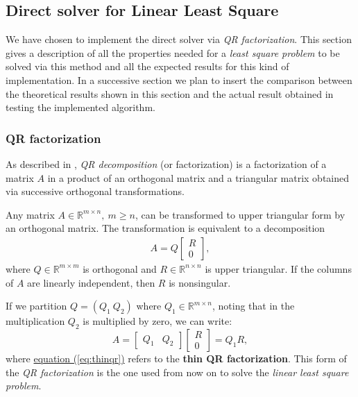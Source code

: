 \subsection{Direct solver for Linear Least Square}
\label{sec:qr}
We have chosen to implement the direct solver via \textit{QR factorization}. This section gives a description of all the properties needed for a \textit{least square problem} to be solved via this method and all the expected results for this kind of implementation. In a successive section we plan to insert the comparison between the theoretical results shown in this section and the actual result obtained in testing the implemented algorithm.
\subsubsection{QR factorization}
\label{subsec:qr}
As described in \parencite[Chap. 5]{elden}, \textit{QR decomposition} (or factorization) is a factorization of a matrix $A$ in a product of an orthogonal matrix and a triangular matrix obtained via successive orthogonal transformations.
\begin{thm}
\label{thm:qr}
Any matrix $A\in \mathbb{R}^{m\times n},\ m\geq n$, can be transformed to upper triangular form by an orthogonal matrix. The transformation is equivalent to a decomposition
\begin{align*}
    A = Q\begin{bmatrix}R \\ 0\end{bmatrix},
\end{align*} where $Q\in \mathbb{R}^{m\times m}$ is orthogonal and $R\in \mathbb{R}^{n\times n}$ is upper triangular. If the columns of $A$ are linearly independent, then $R$ is nonsingular.
\end{thm}
If we partition $Q = (Q_1\ Q_2)$ where $Q_1\in \mathbb{R}^{m\times n}$, noting that in the multiplication $Q_2$ is multiplied by zero, we can write:
\begin{equation}
\label{eq:thinqr}
    A = \begin{bmatrix}Q_1 & Q_2\end{bmatrix}\begin{bmatrix}R \\ 0\end{bmatrix} = Q_1R,
\end{equation}
where \hyperref[eq:thinqr]{equation (\ref{eq:thinqr})} refers to the \textbf{thin QR factorization}. This form of the \textit{QR factorization} is the one used from now on to solve the \textit{linear least square problem}.

